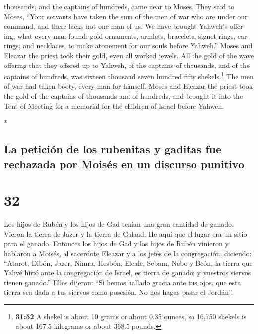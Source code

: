 \begin{paracol}{2}
\begin{otherlanguage}{english}
thousands, and the captains of hundreds, came near to Moses.
 They said to Moses, ``Your servants have taken the sum
of the men of war who are under our command, and there lacks not one man
of us.  We have brought Yahweh's offering, what every man
found: gold ornaments, armlets, bracelets, signet rings, earrings, and
necklaces, to make atonement for our souls before Yahweh.''
 Moses and Eleazar the priest took their gold, even all
worked jewels.  All the gold of the wave offering that
they offered up to Yahweh, of the captains of thousands, and of the
captains of hundreds, was sixteen thousand seven hundred fifty
shekels.\footnote{\textbf{31:52} A shekel is about 10 grams or about
  0.35 ounces, so 16,750 shekels is about 167.5 kilograms or about 368.5
  pounds.}  The men of war had taken booty, every man for
himself.  Moses and Eleazar the priest took the gold of
the captains of thousands and of hundreds, and brought it into the Tent
of Meeting for a memorial for the children of Israel before Yahweh.

\end{otherlanguage}

\switchcolumn[0]*

\hypertarget{la-peticiuxf3n-de-los-rubenitas-y-gaditas-fue-rechazada-por-moisuxe9s-en-un-discurso-punitivo}{%
\subsection{La petición de los rubenitas y gaditas fue rechazada por
Moisés en un discurso
punitivo}\label{la-peticiuxf3n-de-los-rubenitas-y-gaditas-fue-rechazada-por-moisuxe9s-en-un-discurso-punitivo}}

\hypertarget{section-62}{%
\section{32}\label{section-62}}

 Los hijos de Rubén y los hijos de Gad tenían una gran
cantidad de ganado. Vieron la tierra de Jazer y la tierra de Galaad. He
aquí que el lugar era un sitio para el ganado.  Entonces
los hijos de Gad y los hijos de Rubén vinieron y hablaron a Moisés, al
sacerdote Eleazar y a los jefes de la congregación, diciendo:
 ``Atarot, Dibón, Jazer, Nimra, Hesbón, Eleale, Sebam,
Nebo y Beón,  la tierra que Yahvé hirió ante la
congregación de Israel, es tierra de ganado; y vuestros siervos tienen
ganado.''  Ellos dijeron: ``Si hemos hallado gracia ante
tus ojos, que esta tierra sea dada a tus siervos como posesión. No nos
hagas pasar el Jordán''.


\end{paracol}

